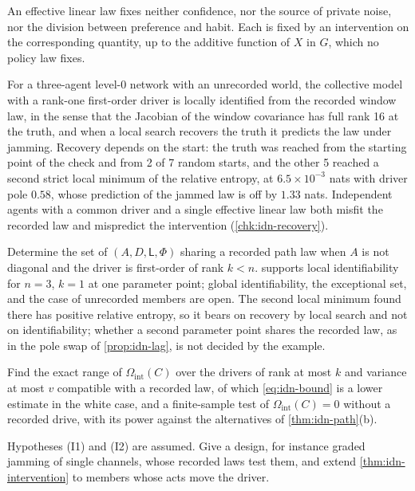 An effective linear law fixes neither confidence, nor the source of private noise, nor the division between preference and habit. Each is fixed by an intervention on the corresponding quantity, up to the additive function of $X$ in $G$, which no policy law fixes.

\begin{observation}\label{obs:idn-recovery}
For a three-agent level-0 network with an unrecorded world, the collective model with a rank-one first-order driver is locally identified from the recorded window law, in the sense that the Jacobian of the window covariance has full rank 16 at the truth, and when a local search recovers the truth it predicts the law under jamming. Recovery depends on the start: the truth was reached from the starting point of the check and from 2 of 7 random starts, and the other 5 reached a second strict local minimum of the relative entropy, at $6.5\times10^{-3}$ nats with driver pole $0.58$, whose prediction of the jammed law is off by $1.33$ nats. Independent agents with a common driver and a single effective linear law both misfit the recorded law and mispredict the intervention (\cref{chk:idn-recovery}).
\end{observation}

\begin{openproblem}\label{open:idn-mixed}
Determine the set of $(A,D,\mathsf L,\Phi)$ sharing a recorded path law when $A$ is not diagonal and the driver is first-order of rank $k<n$.  supports local identifiability for $n=3$, $k=1$ at one parameter point; global identifiability, the exceptional set, and the case of unrecorded members are open. The second local minimum found there has positive relative entropy, so it bears on recovery by local search and not on identifiability; whether a second parameter point shares the recorded law, as in the pole swap of \cref{prop:idn-lag}, is not decided by the example.
\end{openproblem}

\begin{openproblem}\label{open:idn-sharp}
Find the exact range of $\Omega_{\mathrm{int}}(C)$ over the drivers of rank at most $k$ and variance at most $v$ compatible with a recorded law, of which \cref{eq:idn-bound} is a lower estimate in the white case, and a finite-sample test of $\Omega_{\mathrm{int}}(C)=0$ without a recorded drive, with its power against the alternatives of \cref{thm:idn-path}(b).
\end{openproblem}

\begin{openproblem}\label{open:idn-invariance}
Hypotheses (I1) and (I2) are assumed. Give a design, for instance graded jamming of single channels, whose recorded laws test them, and extend \cref{thm:idn-intervention} to members whose acts move the driver.
\end{openproblem}
